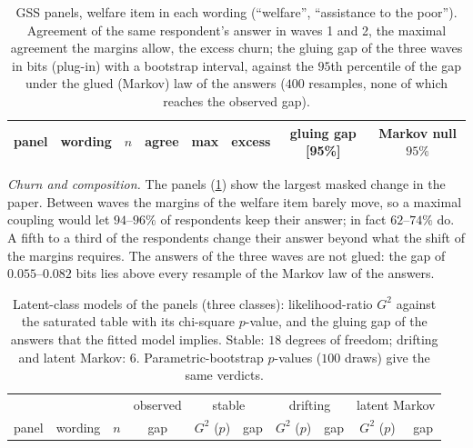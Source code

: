 \documentclass[11pt]{article}
\theoremstyle{definition}
\theoremstyle{remark}
\begin{document}
\begin{table}[ht]
\centering\scriptsize\setlength{\tabcolsep}{3pt}
\caption{GSS panels, welfare item in each wording (``welfare'', ``assistance to the poor''). Agreement of the same respondent's answer
in waves 1 and 2, the maximal agreement the margins allow, the excess churn; the gluing gap of the three waves in bits (plug-in) with a
bootstrap interval, against the $95$th percentile of the gap under the glued (Markov) law of the answers ($400$ resamples, none of which
reaches the observed gap).}\label{tab:panels}
\begin{tabular}{llcccccc}
\toprule
panel & wording & $n$ & agree & max & excess & gluing gap [95\%] & Markov null $95\%$\\
\midrule

\end{tabular}
\end{table}

\emph{Churn and composition.} The panels (\cref{tab:panels}) show the largest masked change in the paper. Between waves the margins of the
welfare item barely move, so a maximal coupling would let $94$--$96\%$ of respondents keep their answer; in fact $62$--$74\%$ do. A fifth to a
third of the respondents change their answer beyond what the shift of the margins requires. The answers of the three waves are not
glued: the gap of $0.055$--$0.082$ bits lies above every resample of the Markov law of the answers.

\begin{table}[ht]
\centering\scriptsize\setlength{\tabcolsep}{3pt}
\caption{Latent-class models of the panels (three classes): likelihood-ratio $G^2$ against the saturated table with its chi-square
$p$-value, and the gluing gap of the answers that the fitted model implies. Stable: $18$ degrees of freedom; drifting and latent Markov: $6$.
Parametric-bootstrap $p$-values ($100$ draws) give the same verdicts.}\label{tab:panelmodels}
\begin{tabular}{llcccccccc}
\toprule
 & & & observed & \multicolumn{2}{c}{stable} & \multicolumn{2}{c}{drifting} & \multicolumn{2}{c}{latent Markov}\\
panel & wording & $n$ & gap & $G^2$ ($p$) & gap & $G^2$ ($p$) & gap & $G^2$ ($p$) & gap\\
\midrule

\end{tabular}
\end{table}
\end{document}
